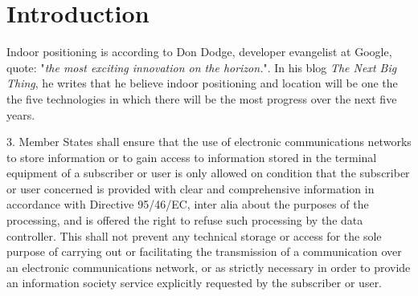 \chapter{Introduction}
Indoor positioning is according to Don Dodge, developer evangelist at Google, quote: "\textit{the most exciting innovation on the horizon.}"\cite{DonDNextBigThing}.
In his blog \textit{The Next Big Thing}, he writes that he believe indoor positioning and location will be one the the five technologies in which there will be the most progress over the next five years\cite{DonDIndoorIsNext}.

3. Member States shall ensure that the use of electronic communications networks to store information or to gain access to information stored in the terminal equipment of a subscriber or user is only allowed on condition that the subscriber or user concerned is provided with clear and comprehensive information in accordance with Directive 95/46/EC, inter alia about the purposes of the processing, and is offered the right to refuse such processing by the data controller. This shall not prevent any technical storage or access for the sole purpose of carrying out or facilitating the transmission of a communication over an electronic communications network, or as strictly necessary in order to provide an information society service explicitly requested by the subscriber or user.
